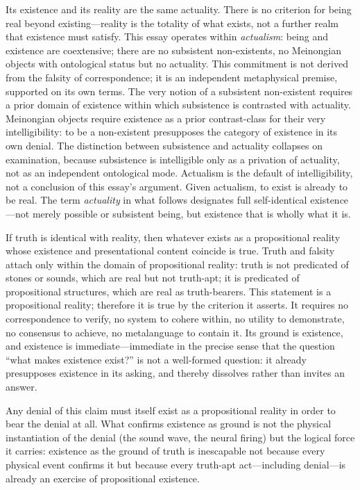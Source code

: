 \documentclass[11pt, oneside]{article}
\begin{document}
Its existence and its reality are the same actuality. There is no criterion
for being real beyond existing---reality is the totality of what exists,
not a further realm that existence must satisfy. This essay operates
within \textit{actualism}: being and existence are coextensive; there are
no subsistent non-existents, no Meinongian objects with ontological
status but no actuality. This commitment is not derived from the falsity
of correspondence; it is an independent metaphysical premise, supported
on its own terms. The very notion of a subsistent non-existent requires
a prior domain of existence within which subsistence is contrasted with
actuality. Meinongian objects require existence as a prior contrast-class
for their very intelligibility: to be a non-existent presupposes the
category of existence in its own denial. The distinction between
subsistence and actuality collapses on examination, because subsistence
is intelligible only as a privation of actuality, not as an independent
ontological mode. Actualism is the default of intelligibility, not a
conclusion of this essay's argument. Given actualism, to exist is already
to be real. The term \textit{actuality} in what follows designates full
self-identical existence---not merely possible or subsistent being, but
existence that is wholly what it is.

If truth is identical with reality, then whatever exists as a
propositional reality whose existence and presentational content coincide is
true. Truth and falsity attach only within the domain of propositional
reality:
truth is not predicated of stones or sounds, which are real but not
truth-apt; it is predicated of propositional structures, which are real
as truth-bearers. This statement is a propositional reality; therefore
it is true by the criterion it asserts. It requires no correspondence to
verify, no system to cohere within, no utility to demonstrate, no
consensus to achieve, no metalanguage to contain it. Its ground is
existence, and existence is immediate---immediate in the precise sense
that the question ``what makes existence exist?'' is not a well-formed
question: it already presupposes existence in its asking, and thereby
dissolves rather than invites an answer.

Any denial of this claim must itself exist as a propositional
reality in order to bear the denial at all. What confirms existence as
ground is not the physical instantiation of the denial (the sound wave,
the neural firing) but the logical force it carries: existence as the
ground of truth is inescapable not because every physical event confirms
it but because every truth-apt act---including denial---is already an
exercise of propositional existence.
\end{document}
